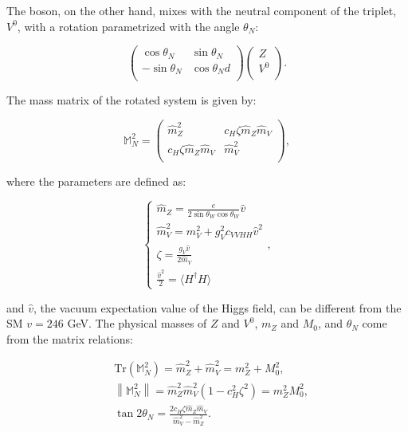 \noindent The \Z boson, on the other hand, mixes with the neutral component of the triplet, $V^0$, with a rotation parametrized with the angle $\theta_N$:

\begin{equation}
\begin{pmatrix}
\cos{\theta_N} & \sin{\theta_N} \\
-\sin{\theta_N} & \cos{\theta_N}d \\
\end{pmatrix}
\begin{pmatrix}
Z  \\
V^0  \\
\end{pmatrix}
.
\label{eq:mixing}
\end{equation}

\noindent The mass matrix of the rotated system is given by:

\begin{equation}
\mathbb{M}_N^2 =
\begin{pmatrix}
\hat{m}_Z^2 & c_H \zeta \hat{m}_Z \hat{m}_V \\
c_H \zeta \hat{m}_Z \hat{m}_V & \hat{m}_V^2 \\
\end{pmatrix}
,
\label{eq:mass_matrix_Z}
\end{equation}

\noindent where the parameters are defined as:

\begin{equation}
\left\{
\begin{array}{l}
\hat{m}_Z = \frac{e}{2 \sin{\theta_W} \cos{\theta_W}}\hat{v} \\
\hat{m}_V^2 = m_V^2 + g_V^2 c_{VVHH} {\hat{v}}^2\\
\zeta = \frac{g_V \hat{v}}{2 \hat{m}_V}\\
\frac{\hat{v}^2}{2} = \langle H^{\dagger} H \rangle
\end{array},
\right.
\label{eq:mass_matrix_param_Z}
\end{equation}

\noindent and $\hat{v}$, the vacuum expectation value of the Higgs field, can be different from the SM $v = 246$ GeV. The physical masses of $Z$ and $V^0$, $m_Z$ and $M_0$, and $\theta_N$ come from the matrix relations:

\begin{equation}
\begin{split}
 & \mbox{Tr}\left( \mathbb{M}_N^2 \right) = \hat{m}_Z^2 + \hat{m}_V^2 = m_Z^2 + M_0^2,\\
 & \left\| \mathbb{M}_N^2 \right\| = \hat{m}_Z^2 \hat{m}_V^2 \left( 1 - c_H^2 {\zeta}^2\right) = m_Z^2 M_0^2,\\
 & \tan{2 \theta_N} = \frac{2 c_H \zeta \hat{m}_Z \hat{m}_V}{\hat{m}_V^2 - \hat{m}_Z^2}.
\end{split}
\label{eq:mass_eig_Z}
\end{equation}

